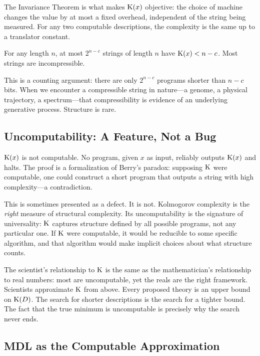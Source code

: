 The Invariance Theorem is what makes $\mathrm{K}(x)$ objective: the choice of machine
changes the value by at most a fixed overhead, independent of the string being
measured. For any two computable descriptions, the complexity is the same up
to a translator constant.

\begin{proposition}
For any length $n$, at most $2^{n-c}$ strings of length $n$ have
$\mathrm{K}(x) < n - c$. Most strings are incompressible.
\end{proposition}

This is a counting argument: there are only $2^{n-c}$ programs shorter than
$n-c$ bits. When we encounter a compressible string in nature---a genome, a
physical trajectory, a spectrum---that compressibility is evidence of an
underlying generative process. Structure is rare.

\subsection{Uncomputability: A Feature, Not a Bug}

$\mathrm{K}(x)$ is not computable. No program, given $x$ as input, reliably outputs
$\mathrm{K}(x)$ and halts. The proof is a formalization of Berry's paradox: supposing
$\mathrm{K}$ were computable, one could construct a short program that outputs a string
with high complexity---a contradiction.

This is sometimes presented as a defect. It is not. Kolmogorov complexity is
the \emph{right} measure of structural complexity. Its uncomputability is the
signature of universality: $\mathrm{K}$ captures structure defined by all possible
programs, not any particular one. If $\mathrm{K}$ were computable, it would be
reducible to some specific algorithm, and that algorithm would make implicit
choices about what structure counts.

The scientist's relationship to $\mathrm{K}$ is the same as the mathematician's
relationship to real numbers: most are uncomputable, yet the reals are the
right framework. Scientists approximate $\mathrm{K}$ from above. Every proposed
theory is an upper bound on $\mathrm{K}(D)$. The search for shorter descriptions is
the search for a tighter bound. The fact that the true minimum is uncomputable
is precisely why the search never ends.

\subsection{MDL as the Computable Approximation}

